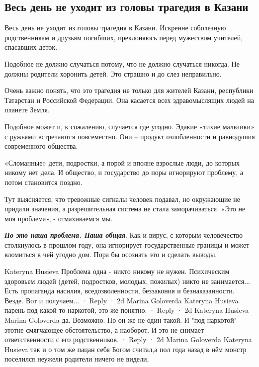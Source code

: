  
 
 
 
 
\subsection{Весь день не уходит из головы трагедия в Казани}
\label{sec:11_05_2021.fb.mogilnickij_maksim.1.tragedia_kazan}

Весь день не уходит из головы трагедия в Казани. Искренне соболезную
родственникам и друзьям погибших, преклоняюсь перед мужеством учителей,
спасавших деток.

Подобное не должно случаться потому, что не должно случаться никогда. Не должны
родители хоронить детей. Это страшно и до слез неправильно.

Очень важно понять, что это трагедия не только для жителей Казани, республики
Татарстан и Российской Федерации. Она касается всех здравомыслящих людей на
планете Земля.

Подобное может и, к сожалению, случается где угодно. Эдакие «тихие мальчики» с
ружьями встречаются повсеместно. Они – продукт озлобленности и равнодушия
современного общества.

«Сломанные» дети, подростки, а порой и вполне взрослые люди, до которых никому
нет дела. И общество, и государство до поры игнорируют проблему, а потом
становится поздно.

Тут выясняется, что тревожные сигналы человек подавал, но окружающие не придали
значения, а разрешительная система не стала заморачиваться. «Это не моя
проблема», - отмахиваемся мы.

\textbf{\emph{Но это наша проблема. Наша общая}}. Как и вирус, с которым человечество
столкнулось в прошлом году, она игнорирует государственные границы и может
вломиться в чей угодно дом. Пора бы осознать это и сделать выводы.

Kateryna Husieva
Проблема одна - никто никому не нужен. Психическим здоровьем людей (детей, подростков, молодых, пожилых) никто не занимается... Есть пропаганда насилия, вседозволенности, беззакония и безнаказанности. Везде. Вот и получаем...
 · Reply · 2d
Marina Goloverda
Kateryna Husieva парень под какой то наркотой, это же понятно.
 · Reply · 2d
Kateryna Husieva
Marina Goloverda да. Возможно. Но он же не один такой. И "под наркотой" - этотне смягчающее обстоятельство, а наоборот. И это не снимает ответственности с его родственников.
 · Reply · 2d
Marina Goloverda
Kateryna Husieva так и о том же пацан себя Богом считал,а пол года назад в нём монстр поселился неужели родители ничего не видели,

